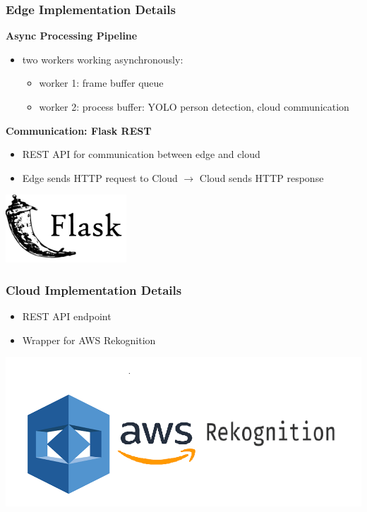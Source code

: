 \documentclass{beamer}
\begin{document}
\begin{frame}
    \frametitle{Edge Implementation Details}
    \textbf{Async Processing Pipeline}
    \begin{itemize}

    \item two workers working asynchronously: 
    \begin{itemize}
        \item worker 1: frame buffer queue
        \item worker 2: process buffer: YOLO person detection, cloud communication
    \end{itemize}

\end{itemize}

\textbf{Communication: Flask REST}
\begin{itemize}
    \item REST API for communication between edge and cloud
    \item Edge sends HTTP request to Cloud $\rightarrow$ Cloud sends HTTP response
\end{itemize}
\begin{center}

    \includegraphics[width=0.34\textwidth]{./res/flask.png}
\end{center}

    \end{frame}

\begin{frame}
\frametitle{Cloud Implementation Details}
    \begin{itemize}
        \item REST API endpoint
        \item Wrapper for AWS Rekognition
    \end{itemize}
    \begin{center}
        \includegraphics[width=0.7\linewidth]{./res/rekognition.png}
    \end{center}


\end{frame}
\end{document}

